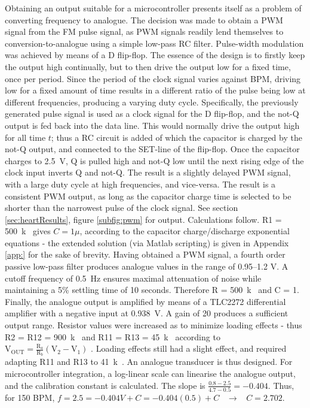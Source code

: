 Obtaining an output suitable for a microcontroller presents itself as a problem of converting frequency to analogue. The decision was made to obtain a PWM signal from the FM pulse signal, as PWM signals readily lend themselves to conversion-to-analogue using a simple low-pass RC filter. Pulse-width modulation was achieved by means of a D flip-flop. The essence of the design is to firstly keep the output high continually, but to then drive the output low for a fixed time, once per period. Since the period of the clock signal varies against BPM, driving low for a fixed amount of time results in a different ratio of the pulse being low at different frequencies, producing a varying duty cycle. Specifically, the previously generated pulse signal is used as a clock signal for the D flip-flop, and the not-Q output is fed back into the data line. This would normally drive the output high for all time $t$; thus a RC circuit is added of which the capacitor is charged by the not-Q output, and connected to the SET-line of the flip-flop. Once the capacitor charges to \SI{2.5}{V}, Q is pulled high and not-Q low until the next rising edge of the clock input inverts Q and not-Q. The result is a slightly delayed PWM signal, with a large duty cycle at high frequencies, and vice-versa. The result is a consistent PWM output, as long as the capacitor charge time is selected to be shorter than the narrowest pulse of the clock signal. See section \ref{sec:heartResults}, figure \ref{subfig:pwm} for output. Calculations follow. R1 = \SI{500}{k\Omega} gives $C = 1\mu$, according to the capacitor charge/discharge exponential equations - the extended solution (via Matlab scripting) is given in Appendix \ref{app:} for the sake of brevity. Having obtained a PWM signal, a fourth order passive low-pass filter produces analogue values in the range of \numrange{0.95}{1.2} \si{V}. A cutoff frequency of \SI{0.5}{Hz} ensures maximal attenuation of noise while maintaining a 5\% settling time of 10 seconds. Therefore R = \SI{500}{k\Omega} and C = \SI{1}{\mu}. Finally, the analogue output is amplified by means of a TLC2272 differential amplifier with a negative input at \SI{0.938}{V}. A gain of 20 produces a sufficient output range. Resistor values were increased as to minimize loading effects - thus R2 = R12 = \SI{900}{k\Omega} and R11 = R13 = \SI{45}{k\Omega} according to $\mathrm{V}_{\mathrm{OUT}}=\frac{\mathrm{R}_{a}}{\mathrm{R}_{b}}\left(\mathrm{V}_{2}-\mathrm{V}_{1}\right)$ \cite{opamp}. Loading effects still had a slight effect, and required adapting R11 and R13 to \SI{41}{k\Omega}. An analogue transducer is thus designed. For microcontroller integration, a log-linear scale can linearise the analogue output, and the calibration constant is calculated. The slope is $\frac{0.8-2.5}{4.7-0.5} = -0.404$. Thus, for 150 BPM, $f = 2.5 = -0.404V + C = -0.404(0.5) + C \;\;\; \rightarrow \;\;\; C = 2.702$.\\
